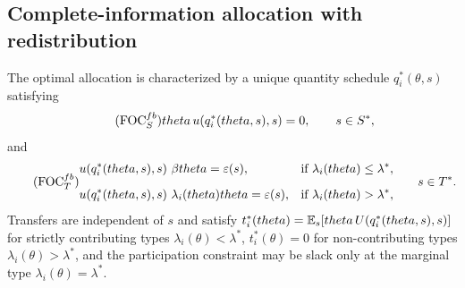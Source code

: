 \documentclass[master.tex]{subfiles}
\begin{document}
\subsection{Complete-information allocation with redistribution}

\begin{proposition}\label{prop:FBalloc}
The optimal allocation is characterized by a unique quantity schedule $q_i^*(\theta,s)$ satisfying
\[\tag{FOC$_S^{fb}$}\label{FB-S}
\theta\,u\!\left(q_i^*(\theta,s),s\right)=0,
\qquad s\in S^*,
\]
and
\[\tag{FOC$_T^{fb}$}\label{FB-T}
\begin{aligned}   
& u\!\left(q_i^*(\theta,s),s\right)\,\beta \theta= \varepsilon(s), & \text{if } \lambda_i(\theta)\leq \lambda^*,\\[6pt]
& u\!\left(q_i^*(\theta,s),s\right)\,\lambda_i(\theta)\theta=\varepsilon(s), & \text{if } \lambda_i(\theta)>\lambda^*,
\end{aligned}
\qquad s\in T^*.
\]
Transfers are independent of $s$ and satisfy $t_i^*(theta)=\mathbb{E}_s\!\left[theta\,U\!\left(q_i^*(theta,s),s\right)\right]$ for strictly contributing types $\lambda_i(\theta)<\lambda^*$, $t_i^*(\theta)=0$ for non-contributing types $\lambda_i(\theta)>\lambda^*$, and the participation constraint may be slack only at the marginal type $\lambda_i(\theta)=\lambda^*$.
\end{proposition}
\end{document}
